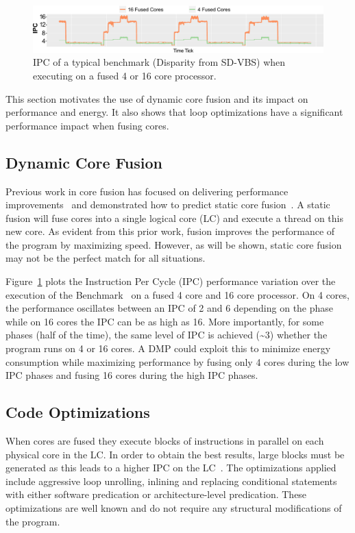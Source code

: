 \begin{figure}[t]
    \centering
    \includegraphics[width=\textwidth]{cases-paper/graphics/motivation/disp_opt_4_16_3.pdf}
    \caption{IPC of a typical benchmark (Disparity from SD-VBS) when executing on a fused 4 or 16 core processor.} 
    \label{fig:disp_ex}
	\vspace{5mm}

\end{figure}

This section motivates the use of dynamic core fusion and its impact on performance and energy.
It also shows that loop optimizations have a significant performance impact when fusing cores.

\subsection{Dynamic Core Fusion}
Previous work in core fusion has focused on delivering performance improvements~\cite{ipek2007CoreFusion,kim2007tflex} and demonstrated how to predict static core fusion~\cite{micolet2016dmpstream}.
A static fusion will fuse cores into a single logical core (LC) and execute a thread on this new core.
As evident from this prior work, fusion improves the performance of the program by maximizing speed.
However, as will be shown, static core fusion may not be the perfect match for all situations.

Figure~\ref{fig:disp_ex} plots the Instruction Per Cycle (IPC) performance variation over the execution of the  Benchmark~\cite{sdvbs} on a fused 4 core and 16 core processor.
On 4 cores, the performance oscillates between an IPC of 2 and 6 depending on the phase while on 16 cores the IPC can be as high as 16.
More importantly, for some phases (half of the time), the same level of IPC is achieved (\textasciitilde3) whether the program runs on 4 or 16 cores.
A DMP could exploit this to minimize energy consumption while maximizing performance by fusing only 4 cores during the low IPC phases and fusing 16 cores during the high IPC phases.

\subsection{Code Optimizations}
When cores are fused they execute blocks of instructions in parallel on each physical core in the LC.
In order to obtain the best results, large blocks must be generated as this leads to a higher IPC on the LC~\cite{micolet2016dmpstream}.
The optimizations applied include aggressive loop unrolling, inlining and replacing conditional statements with either software predication or architecture-level predication.
These optimizations are well known and do not require any structural modifications of the program.

